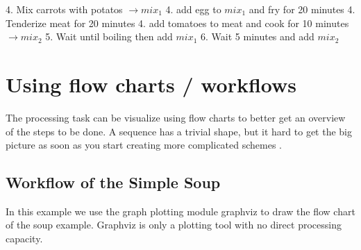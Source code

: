 \documentclass[letterpaper,10pt,english]{sphinxmanual}
\begin{document}
\sphinxAtStartPar
{}
4.  Mix carrots with potatos \(\rightarrow  mix_1\)
4.  add egg to \(mix_1\) and fry for 20 minutes
4.  Tenderize meat for 20 minutes
4.  add tomatoes to meat and cook for 10 minutes \(\rightarrow mix_2\)
5.  Wait until boiling then add \(mix_1\)
6.  Wait 5 minutes and add \(mix_2\)


\section{Using flow charts / workflows}
\label{\detokenize{01-Introduction:using-flow-charts-workflows}}
\sphinxAtStartPar
The processing task can be visualize using flow charts to better get an overview of the steps to be done. A sequence has a trivial shape, but it hard to get the big picture as soon as you start creating more complicated schemes .


\subsection{Workflow of the Simple Soup}
\label{\detokenize{01-Introduction:workflow-of-the-simple-soup}}
\sphinxAtStartPar
In this example we use the graph plotting module graphviz to draw the flow chart of the soup example. Graphviz is only a plotting tool with no direct processing capacity.
\end{document}
